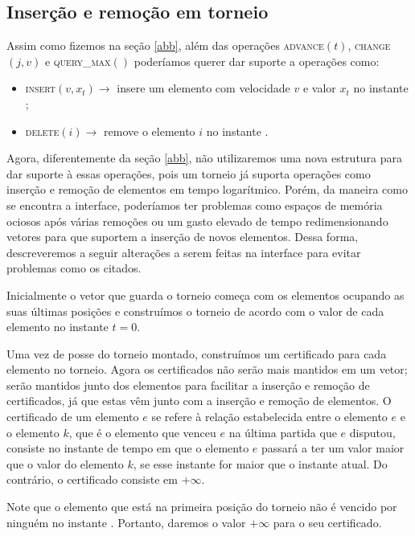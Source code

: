 
\subsection{Inserção e remoção em torneio} \label{trni:secao}

Assim como fizemos na seção \ref{abb}, além das operações
\textsc{advance}$(t)$, \textsc{change}$(j, v)$ e
\textsc{query\_max}$()$ poderíamos querer dar suporte a operações
como:

\begin{itemize}
    \item \textsc{insert}$(v, x_t)\rightarrow$ insere um elemento
    com velocidade $v$ e valor $x_t$ no instante \now;
    \item \textsc{delete}$(i) \rightarrow$ remove o elemento $i$ no
    instante \now.
\end{itemize}
Agora, diferentemente da seção \ref{abb}, não utilizaremos uma nova
estrutura para dar suporte à essas operações, pois um torneio já
suporta operações como inserção e remoção de elementos em tempo
logarítmico. Porém, da maneira como se encontra a interface,
poderíamos ter problemas como espaços de memória ociosos após várias
remoções ou um gasto elevado de tempo redimensionando vetores para
que suportem a inserção de novos elementos. Dessa forma,
descreveremos a seguir alterações a serem feitas na interface para
evitar problemas como os citados.

Inicialmente o vetor que guarda o torneio começa com os elementos
ocupando as suas últimas posições e construímos o torneio de acordo
com o valor de cada elemento no instante $t = 0$.

Uma vez de posse do torneio montado, construímos um certificado para
cada elemento no torneio. Agora os certificados não serão mais
mantidos em um vetor; serão mantidos junto dos elementos para
facilitar a inserção e remoção de certificados, já que estas vêm
junto com a inserção e remoção de elementos. O certificado de um
elemento $e$ se refere à relação estabelecida entre o elemento $e$ e
o elemento $k$, que é o elemento que venceu $e$ na última partida
que $e$ disputou, consiste no instante de tempo em que o elemento
$e$ passará a ter um valor maior que o valor do elemento $k$, se
esse instante for maior que o instante atual. Do contrário, o
certificado consiste em $+\infty$.

Note que o elemento que está na primeira posição do torneio não é
vencido por ninguém no instante \now. Portanto, daremos o valor
$+\infty$ para o seu certificado.

